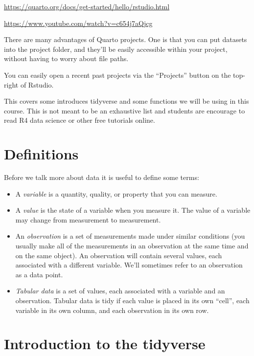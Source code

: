 \documentclass[
  letterpaper,
  DIV=11,
  numbers=noendperiod]{scrreprt}
\begin{document}
\url{https://quarto.org/docs/get-started/hello/rstudio.html}

\url{https://www.youtube.com/watch?v=c654j7aQjcg}

There are many advantages of Quarto projects. One is that you can put
datasets into the project folder, and they'll be easily accessible
within your project, without having to worry about file paths.

You can easily open a recent past projects via the ``Projects'' button
on the top-right of Rstudio.

This covers some introduces tidyverse and some functions we will be
using in this course. This is not meant to be an exhaustive list and
students are encourage to read R4 data science or other free tutorials
online.

\hypertarget{definitions}{%
\chapter{Definitions}\label{definitions}}

Before we talk more about data it is useful to define some terms:

\begin{itemize}
\item
  A \emph{variable} is a quantity, quality, or property that you can
  measure.
\item
  A \emph{value} is the state of a variable when you measure it. The
  value of a variable may change from measurement to measurement.
\item
  An \emph{observation} is a set of measurements made under similar
  conditions (you usually make all of the measurements in an observation
  at the same time and on the same object). An observation will contain
  several values, each associated with a different variable. We'll
  sometimes refer to an observation as a data point.
\item
  \emph{Tabular data} is a set of values, each associated with a
  variable and an observation. Tabular data is tidy if each value is
  placed in its own ``cell'', each variable in its own column, and each
  observation in its own row.
\end{itemize}

\hypertarget{introduction-to-the-tidyverse}{%
\chapter{Introduction to the
tidyverse}\label{introduction-to-the-tidyverse}}
\end{document}
